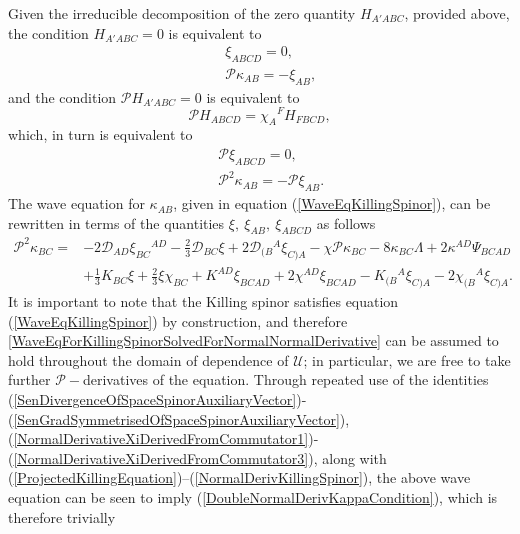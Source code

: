 \documentclass[10pt,a4paper]{article}
\theoremstyle{plain}
\begin{document}
Given the irreducible decomposition of the zero quantity $H_{A'ABC}$, provided above, the condition $H_{A'ABC}=0$ is equivalent to
\begin{subequations}
\begin{eqnarray}
&& \xi_{ABCD}=0,\label{ProjectedKillingEquation}\\ &&
  \mathcal{P}\kappa_{AB}=-\xi_{AB}, \label{NormalDerivKillingSpinor}
\end{eqnarray}
\end{subequations}
and the condition $\mathcal{P} H_{A'ABC}=0$ is equivalent to
\[\mathcal{P} H_{ABCD}=\chi_A{}^F H_{FBCD},\]
which, in turn is equivalent to
\begin{subequations}
\begin{eqnarray}
&&
  \mathcal{P}\xi_{ABCD}=0, \label{NormalDerivProjectedKillingEquation}\\ &&
  \mathcal{P}^2\kappa_{AB}=-\mathcal{P}\xi_{AB}. \label{DoubleNormalDerivKappaCondition}
\end{eqnarray}
\end{subequations}
The wave equation for $\kappa_{AB}$, given in
equation (\ref{WaveEqKillingSpinor}), can be rewritten in terms of the quantities
$\xi,~\xi_{AB},~\xi_{ABCD}$
 as follows
\begin{align}
\mathcal{P}^2\kappa_{BC} = & - 2 \mathcal{D}_{AD}\xi_{BC}{}^{AD} -
\tfrac{2}{3} \mathcal{D}_{BC}\xi + 2
\mathcal{D}_{(B}{}^{A}\xi_{C)A}-\chi\mathcal{P}\kappa_{BC}-8
\kappa_{BC} \Lambda + 2 \kappa^{AD} \Psi_{BCAD}\nonumber\\ & +
\tfrac{1}{3} K_{BC} \xi + \tfrac{2}{3} \xi \chi_{BC} + K^{AD}
\xi_{BCAD} + 2 \chi^{AD} \xi_{BCAD} - K_{(B}{}^{A}\xi_{C)A} - 2
\chi_{(B}{}^{A}\xi_{C)A}.
\label{WaveEqForKillingSpinorSolvedForNormalNormalDerivative}
\end{align}
It is important to note that the Killing spinor satisfies equation
(\ref{WaveEqKillingSpinor}) by construction, and therefore \eqref{WaveEqForKillingSpinorSolvedForNormalNormalDerivative}
can be assumed to hold throughout the domain of dependence of
$\mathcal{U}$; in particular, we are free to take further
$\mathcal{P}-$derivatives of the equation.  Through repeated use of the
identities
(\ref{SenDivergenceOfSpaceSpinorAuxiliaryVector})-(\ref{SenGradSymmetrisedOfSpaceSpinorAuxiliaryVector}),
(\ref{NormalDerivativeXiDerivedFromCommutator1})-(\ref{NormalDerivativeXiDerivedFromCommutator3}),
along with
(\ref{ProjectedKillingEquation})--(\ref{NormalDerivKillingSpinor}),
the above wave equation can be seen to imply
(\ref{DoubleNormalDerivKappaCondition}), which is therefore trivially
\end{document}
